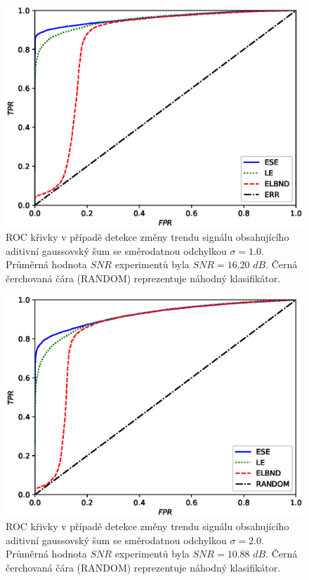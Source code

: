 \begin{figure}[ht!]
    \centering
    \includegraphics[scale=0.73]{IMG/appel_roc/roc_1.eps}
    \caption{ROC křivky v případě detekce změny trendu signálu obsahujícího aditivní gaussovský šum se směrodatnou odchylkou $\sigma=1.0$. Průměrná hodnota $SNR$ experimentů byla $SNR=16.20$ $dB$. Černá čerchovaná čára (RANDOM) reprezentuje náhodný klasifikátor.}
    \label{fig:roc_1}
\end{figure}
\begin{figure}[ht!]
    \centering
    \includegraphics[scale=0.73]{IMG/appel_roc/roc_2.eps}
    \caption{ROC křivky v případě detekce změny trendu signálu obsahujícího aditivní gaussovský šum se směrodatnou odchylkou $\sigma=2.0$. Průměrná hodnota $SNR$ experimentů byla $SNR=10.88$ $dB$. Černá čerchovaná čára (RANDOM) reprezentuje náhodný klasifikátor.}
    \label{fig:roc_2}
\end{figure}
